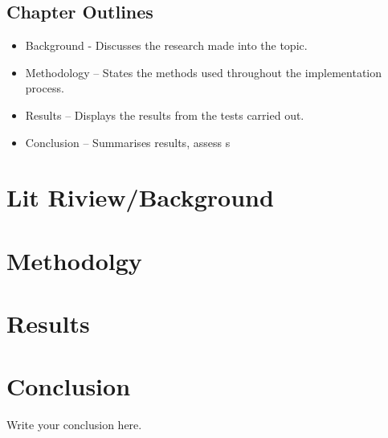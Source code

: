 \documentclass{article}
\begin{document}
\subsection{Chapter Outlines}
\begin{itemize}
	\item Background - Discusses the research made into the topic.
	\item Methodology – States the methods used throughout the implementation process.
	\item Results – Displays the results from the tests carried out.
	\item Conclusion – Summarises results, assess s	
\end{itemize}
\section{Lit Riview/Background}

\section{Methodolgy}

\section{Results}

\section{Conclusion}
Write your conclusion here.



\end{document}
